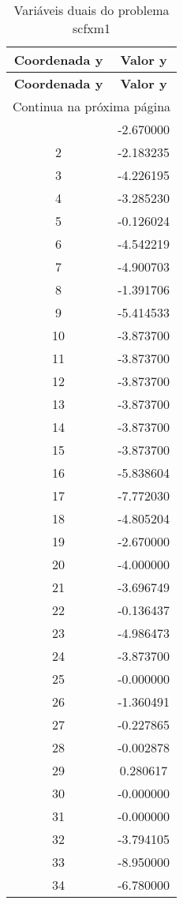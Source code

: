 \documentclass[12pt]{article}
\begin{document}
\begin{longtable}{@{}cc@{}}
\caption{Variáveis duais do problema scfxm1} \\
\toprule
\textbf{Coordenada y} & \textbf{Valor y} \\
\midrule
\endfirsthead

\toprule
\textbf{Coordenada y} & \textbf{Valor y} \\
\midrule
\endhead

\midrule \multicolumn{2}{r}{{Continua na próxima página}} \\ \midrule
\endfoot

\bottomrule
\endlastfoot
1 & -2.670000 \\
2 & -2.183235 \\
3 & -4.226195 \\
4 & -3.285230 \\
5 & -0.126024 \\
6 & -4.542219 \\
7 & -4.900703 \\
8 & -1.391706 \\
9 & -5.414533 \\
10 & -3.873700 \\
11 & -3.873700 \\
12 & -3.873700 \\
13 & -3.873700 \\
14 & -3.873700 \\
15 & -3.873700 \\
16 & -5.838604 \\
17 & -7.772030 \\
18 & -4.805204 \\
19 & -2.670000 \\
20 & -4.000000 \\
21 & -3.696749 \\
22 & -0.136437 \\
23 & -4.986473 \\
24 & -3.873700 \\
25 & -0.000000 \\
26 & -1.360491 \\
27 & -0.227865 \\
28 & -0.002878 \\
29 & 0.280617 \\
30 & -0.000000 \\
31 & -0.000000 \\
32 & -3.794105 \\
33 & -8.950000 \\
34 & -6.780000 \\

\end{longtable}
\end{document}

